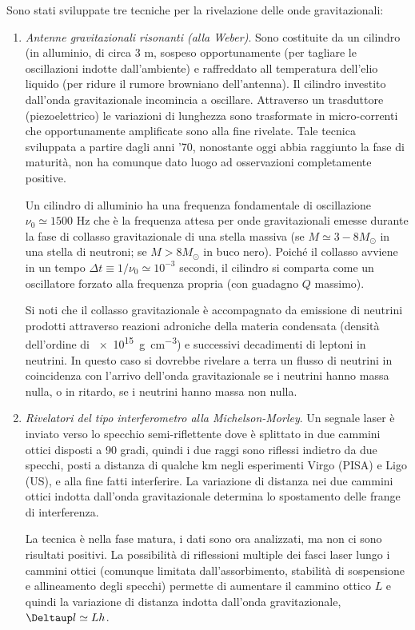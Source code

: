 Sono stati sviluppate tre tecniche per la rivelazione delle onde gravitazionali:
\begin{enumerate}
\item \emph{Antenne gravitazionali risonanti (alla Weber)}.  Sono costituite da
  un cilindro (in alluminio, di circa 3 m, sospeso opportunamente (per tagliare
  le oscillazioni indotte dall'ambiente) e raffreddato all temperatura dell'elio
  liquido (per ridure il rumore browniano dell'antenna).  Il cilindro investito
  dall'onda gravitazionale incomincia a oscillare.  Attraverso un trasduttore
  (piezoelettrico) le variazioni di lunghezza sono trasformate in micro-correnti che
  opportunamente amplificate sono alla fine rivelate.  Tale tecnica sviluppata
  a partire dagli anni '70, nonostante oggi abbia raggiunto la fase di maturità,
  non ha comunque dato luogo ad osservazioni completamente positive.

  Un cilindro di alluminio ha una frequenza fondamentale di oscillazione
  $\nu_0 \simeq 1500$ Hz che è la frequenza attesa per onde gravitazionali
  emesse durante la fase di collasso gravitazionale di una stella massiva (se
  $M \simeq 3-8 M_{\odot}$ in una stella di neutroni; se $M > 8 M_{\odot}$ in buco
  nero).  Poiché il collasso avviene in un tempo
  $\Delta t \equiv 1/\nu_0 \simeq 10^{-3}$ secondi, il cilindro si comparta come
  un oscillatore forzato alla frequenza propria (con guadagno $Q$ massimo).

  Si noti che il collasso gravitazionale è accompagnato da emissione di neutrini
  prodotti attraverso reazioni adroniche della materia condensata (densità
  dell'ordine di \SI{e15}{\gram \per \centi \metre \cubed}) e successivi
  decadimenti di leptoni in neutrini.  In questo caso si dovrebbe rivelare a
  terra un flusso di neutrini in coincidenza con l'arrivo dell'onda
  gravitazionale se i neutrini hanno massa nulla, o in ritardo, se i neutrini
  hanno massa non nulla.

\item \emph{Rivelatori del tipo interferometro alla Michelson-Morley}.  Un
  segnale laser è inviato verso lo specchio semi-riflettente dove è splittato in
  due cammini ottici disposti a 90 gradi, quindi i due raggi sono riflessi
  indietro da due specchi, posti a distanza di qualche km negli esperimenti
  Virgo (PISA) e Ligo (US), e alla fine fatti interferire.  La variazione di
  distanza nei due cammini ottici indotta dall'onda gravitazionale determina lo
  spostamento delle frange di interferenza.

  La tecnica è nella fase matura, i dati sono ora analizzati, ma non ci sono
  risultati positivi.  La possibilità di riflessioni multiple dei fasci laser
  lungo i cammini ottici (comunque limitata dall'assorbimento, stabilità di
  sospensione e allineamento degli specchi) permette di aumentare il cammino
  ottico $L$ e quindi la variazione di distanza indotta dall'onda
  gravitazionale, $\var l \simeq L h$.


\end{enumerate}
